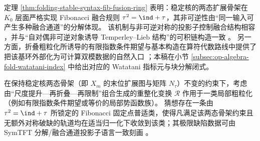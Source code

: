 \begin{remark}[投影子控制的多通道融合与算符代数输入]\label{rem:folding-stable-syntax-noninvertible-links}
定理 \ref{thm:folding-stable-syntax-fib-fusion-ring} 表明：稳定核的两态扩展骨架在 \(K_0\) 层面严格实现 Fibonacci 融合规则 \(\tau^2=\ind+\tau\)，其非可逆性由“同一输入可产生多种融合通道”的分解体现。
该机制与非可逆对称的投影子控制融合结构相容 \cite{ZhangHuangWangYe2026NonInvertibleSymmetriesMixedAnomaliesTwistedBF}，并与“自对偶非可逆对象诱导 Temperley--Lieb 结构”的可积链构造一致 \cite{BlakeneyCorcoranDeLeeuwPozsgayVernier2025TemperleyLiebIntegrableModelsFusionCategories}。
另一方面，折叠粗粒化所诱导的有限指数条件期望与基本构造在算符代数路线中提供了把该基环外部化为可计算双模数据的自然入口 \cite{EvansJones2025OperatorAlgebraicApproachFusionCategorySymmetryLattice}；本稿在小节 \ref{subsec:op-algebra-fold-watatani-index} 中给出对应的 Watatani 指标元与块分解闭式。
\end{remark}

\begin{conjecture}\label{conj:folding-fib-renormalization-attractor}
在保持稳定核两态骨架（即 \(X_m\) 的末位扩展图与矩阵 \(N_\tau\)）不变的约束下，考虑由“尺度提升—再折叠—再限制”组合生成的重整化变换 \(\mathcal R\) 作用于一类局部粗粒化（例如有限指数条件期望或等价的局部势函数族）。
猜想存在一条由 \(\tau^2=\ind+\tau\) 所锁定的 Fibonacci 固定点普适类，使得凡满足该两态骨架约束且无额外对称破缺的轨道均在适当归一化下收敛到该类；其极限缺陷数据可由 SymTFT 分解/融合通道投影子语言一致刻画 \cite{SchaferNamekiTiwariWarmanZhang2025SymTFTMixedStatesNonInvertible}。
\end{conjecture}
